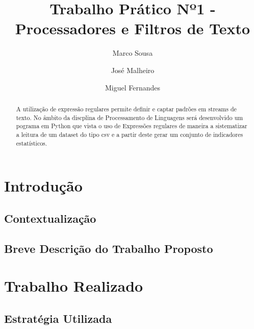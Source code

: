 \documentclass[runningheads]{llncs}
\begin{document}
%
\title{Trabalho Prático Nº1 - Processadores e Filtros de Texto}
%
%
\author{Marco Sousa \and
José Malheiro \and
Miguel Fernandes}
%
%
\maketitle              %
%
\begin{abstract}
A utilização de expressão regulares permite definir e captar padrões em
streams de texto. No âmbito da discplina de Processamento de Linguagens
será desenvolvido um pograma em Python que vista o uso de Expressões regulares
de maneira a sistematizar a leitura de um dataset do tipo csv e a partir deste gerar um 
conjunto de indicadores estatísticos.

\end{abstract}
%
%
%
\section{Introdução}
\subsection{Contextualização} 



\subsection{Breve Descrição do Trabalho Proposto}



\section{Trabalho Realizado} 

\subsection{Estratégia Utilizada} \label{subsec:strat}
\end{document}
